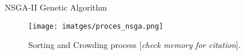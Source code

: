 \begin{frame}{NSGA-II Genetic Algorithm}
\begin{figure}[H]
\begin{minipage}{0.45\textwidth}
{
        }
        \caption{NSGA-II algorithm.}
    \end{minipage}
    \begin{minipage}{0.45\textwidth}
        \centering
        \texttt{[image: imatges/proces\_nsga.png]}
        \caption{Sorting and Crowding process [\textit{check memory for citation}].}
        
      \end{minipage}\hfill
    
\end{figure}

\end{frame}

